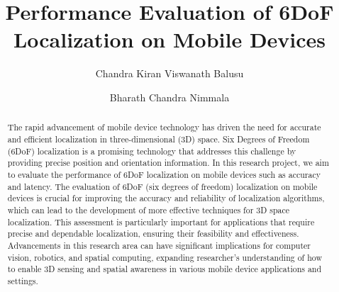 \documentclass[sigconf]{acmart}
\begin{document}
\title{Performance Evaluation of 6DoF Localization on Mobile Devices}

\author{Chandra Kiran Viswanath Balusu}

\author{Bharath Chandra Nimmala}


\begin{abstract}
The rapid advancement of mobile device technology has driven the need for accurate and efficient localization in three-dimensional (3D) space. Six Degrees of Freedom (6DoF) localization is a promising technology that addresses this challenge by providing precise position and orientation information. In this research project, we aim to evaluate the performance of 6DoF localization on mobile devices such as accuracy and latency. The evaluation of 6DoF (six degrees of freedom) localization on mobile devices is crucial for improving the accuracy and reliability of localization algorithms, which can lead to the development of more effective techniques for 3D space localization. This assessment is particularly important for applications that require precise and dependable localization, ensuring their feasibility and effectiveness. Advancements in this research area can have significant implications for computer vision, robotics, and spatial computing, expanding researcher's understanding of how to enable 3D sensing and spatial awareness in various mobile device applications and settings.
\end{abstract}
\end{document}

